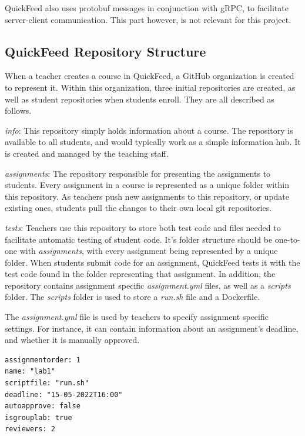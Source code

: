 QuickFeed also uses protobuf messages in conjunction with gRPC, to facilitate server-client communication.
This part however, is not relevant for this project.

\subsection{QuickFeed Repository Structure}
\label{sec:quickfeed-repository-structure}

When a teacher creates a course in QuickFeed, a GitHub organization is created to represent it.
Within this organization, three initial repositories are created, as well as student repositories when students enroll.
They are all described as follows.

\textit{info}: This repository simply holds information about a course.
The repository is available to all students, and would typically work as a simple information hub.
It is created and managed by the teaching staff.

\textit{assignments}: The repository responsible for presenting the assignments to students.
Every assignment in a course is represented as a unique folder within this repository.
As teachers push new assignments to this repository, or update existing ones, students pull the changes to their own local git repositories.

\textit{tests}: Teachers use this repository to store both test code and files needed to facilitate automatic testing of student code.
It's folder structure should be one-to-one with \textit{assignments}, with every assignment being represented by a unique folder.
When students submit code for an assignment, QuickFeed tests it with the test code found in the folder representing that assignment.
In addition, the repository contains assignment specific \textit{assignment.yml} files, as well as a \textit{scripts} folder.
The \textit{scripts} folder is used to store a \textit{run.sh} file and a Dockerfile.

The \textit{assignment.yml} file is used by teachers to specify assignment specific settings.
For instance, it can contain information about an assignment's deadline, and whether it is manually approved.

\begin{lstlisting}[caption={Example contents of an \textit{assignment.yml} file}, numbers=none]
assignmentorder: 1
name: "lab1"
scriptfile: "run.sh"
deadline: "15-05-2022T16:00"
autoapprove: false
isgrouplab: true
reviewers: 2
\end{lstlisting}

